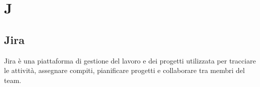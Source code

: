 \section{J} 
\subsection{Jira} 
Jira è una piattaforma di gestione del lavoro e dei progetti utilizzata per tracciare le attività, assegnare compiti, pianificare progetti e collaborare tra membri del team.
